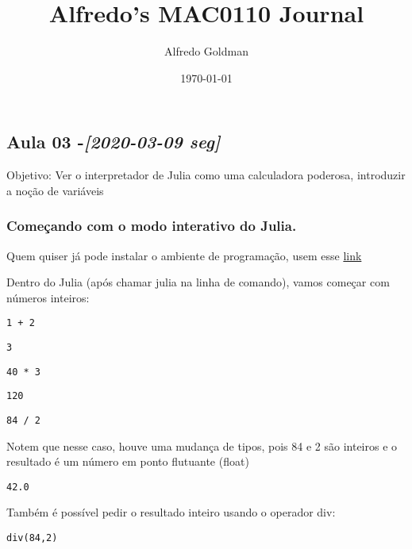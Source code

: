 \documentclass[a4paper]{article}
\author{Alfredo Goldman}
\date{\today}
\title{Alfredo's MAC0110 Journal}
\begin{document}
\maketitle


\label{sec:orgab4ed6f}
\subsection{Aula 03 -\textit{[2020-03-09 seg]}}
\label{sec:orgeb07d66}
Objetivo: Ver o interpretador de Julia como uma calculadora poderosa, introduzir a noção de variáveis
\subsubsection{Começando com o modo interativo do Julia.}
\label{sec:org0be9800}
Quem quiser já pode instalar o ambiente de programação, usem esse \href{https://julialang.org/}{link}

Dentro do Julia (após chamar julia na linha de comando), vamos começar com números inteiros:
\lstset{language=ein-julia,label=orgce508e3,caption= ,captionpos=b,numbers=none}
\begin{lstlisting}
1 + 2
\end{lstlisting}

\begin{verbatim}
3
\end{verbatim}


\lstset{language=ein-julia,label= ,caption= ,captionpos=b,numbers=none}
\begin{lstlisting}
40 * 3
\end{lstlisting}

\begin{verbatim}
120
\end{verbatim}


\lstset{language=ein-julia,label= ,caption= ,captionpos=b,numbers=none}
\begin{lstlisting}
84 / 2
\end{lstlisting}
Notem que nesse caso, houve uma mudança de tipos, pois 84 e 2 são inteiros e o resultado
é um número em ponto flutuante (float)
\begin{verbatim}
42.0
\end{verbatim}


Também é possível pedir o resultado inteiro usando o operador div:
\lstset{language=ein-julia,label= ,caption= ,captionpos=b,numbers=none}
\begin{lstlisting}
div(84,2)
\end{lstlisting}
\end{document}
